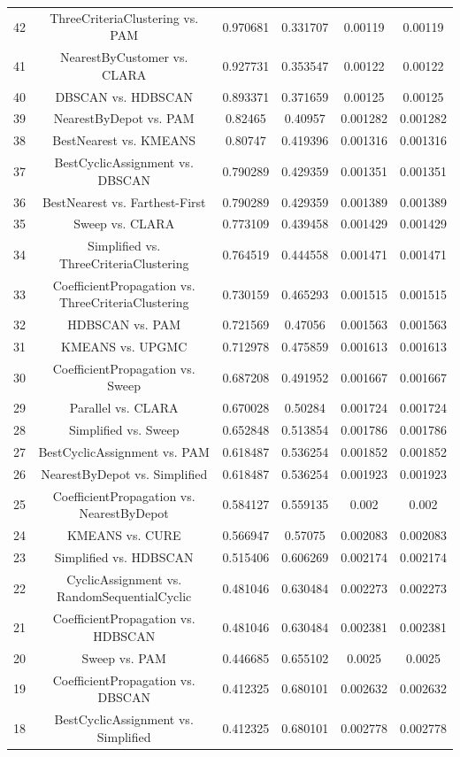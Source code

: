 \documentclass[a4paper,10pt]{article}
\begin{document}
\begin{landscape}
\begin{table}[!htp]
\begin{tabular}{cccccc}
42&ThreeCriteriaClustering vs. PAM&0.970681&0.331707&0.00119&0.00119\\
41&NearestByCustomer vs. CLARA&0.927731&0.353547&0.00122&0.00122\\
40&DBSCAN vs. HDBSCAN&0.893371&0.371659&0.00125&0.00125\\
39&NearestByDepot vs. PAM&0.82465&0.40957&0.001282&0.001282\\
38&BestNearest vs. KMEANS&0.80747&0.419396&0.001316&0.001316\\
37&BestCyclicAssignment vs. DBSCAN&0.790289&0.429359&0.001351&0.001351\\
36&BestNearest vs. Farthest-First&0.790289&0.429359&0.001389&0.001389\\
35&Sweep vs. CLARA&0.773109&0.439458&0.001429&0.001429\\
34&Simplified vs. ThreeCriteriaClustering&0.764519&0.444558&0.001471&0.001471\\
33&CoefficientPropagation vs. ThreeCriteriaClustering&0.730159&0.465293&0.001515&0.001515\\
32&HDBSCAN vs. PAM&0.721569&0.47056&0.001563&0.001563\\
31&KMEANS vs. UPGMC&0.712978&0.475859&0.001613&0.001613\\
30&CoefficientPropagation vs. Sweep&0.687208&0.491952&0.001667&0.001667\\
29&Parallel vs. CLARA&0.670028&0.50284&0.001724&0.001724\\
28&Simplified vs. Sweep&0.652848&0.513854&0.001786&0.001786\\
27&BestCyclicAssignment vs. PAM&0.618487&0.536254&0.001852&0.001852\\
26&NearestByDepot vs. Simplified&0.618487&0.536254&0.001923&0.001923\\
25&CoefficientPropagation vs. NearestByDepot&0.584127&0.559135&0.002&0.002\\
24&KMEANS vs. CURE&0.566947&0.57075&0.002083&0.002083\\
23&Simplified vs. HDBSCAN&0.515406&0.606269&0.002174&0.002174\\
22&CyclicAssignment vs. RandomSequentialCyclic&0.481046&0.630484&0.002273&0.002273\\
21&CoefficientPropagation vs. HDBSCAN&0.481046&0.630484&0.002381&0.002381\\
20&Sweep vs. PAM&0.446685&0.655102&0.0025&0.0025\\
19&CoefficientPropagation vs. DBSCAN&0.412325&0.680101&0.002632&0.002632\\
18&BestCyclicAssignment vs. Simplified&0.412325&0.680101&0.002778&0.002778\\

\end{tabular}
\end{table}
\end{landscape}
\end{document}
